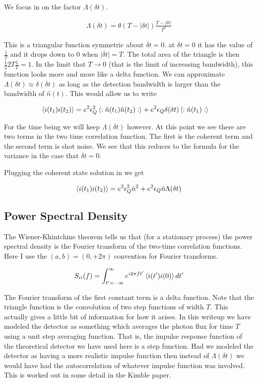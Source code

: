 \documentclass[12pt]{article}
\begin{document}
We focus in on the factor $\Lambda(\delta t)$. 

\begin{align}
\Lambda(\delta t) = \theta(T - |\delta t|)\frac{T-|\delta t|}{T^2}
\end{align}

This is a triangular function symmetric about $\delta t=0$. at $\delta t=0$ it has the value of $\frac{1}{T}$ and it drops down to 0 when $|\delta t| = T$. The total area of the triangle is then $\frac{1}{2} 2T \frac{1}{T} = 1$. In the limit that $T \rightarrow 0$ (that is the limit of increasing bandwidth), this function looks more and more like a delta function. We can approximate $\Lambda(\delta t) \approx \delta(\delta t)$ as long as the detection bandwidth is larger than the bandwidth of $\hat{n}(t)$. This would allow us to write

\begin{align}
\Braket{i(t_1)i(t_2)} &=e^2 \epsilon_Q^2 \Braket{:\hat{n}(t_1)\hat{n}(t_2):} + e^2 \epsilon_Q \delta(\delta t) \braket{:\hat{n}(t_1):}
\end{align}

For the time being we will keep $\Lambda(\delta t)$ however. At this point we see there are two terms in the two time correlation function. The first is the coherent term and the second term is shot noise. We see that this reduces to the formula for the variance in the case that $\delta t=0$.

Plugging the coherent state solution in we get

\begin{align}
\braket{i(t_1)i(t_2)} = e^2 \epsilon_Q^2 \bar{n}^2 + e^2 \epsilon_Q \bar{n} \Lambda(\delta t)
\end{align}

\subsection{Power Spectral Density}

The Wiener-Khintchine theorem tells us that (for a stationary process) the power spectral density is the Fourier transform of the two-time correlation functions. Here I use the $(a,b) = (0,+2\pi)$ convention for Fourier transforms.

\begin{align}
S_{ii}(f) = \int_{t'=-\infty}^{\infty} e^{i2\pi f t'} \Braket{i(t')i(0)} dt'
\end{align}

The Fourier transform of the first constant term is a delta function. 
Note that the triangle function is the convolution of two step functions of width $T$. This actually gives a little bit of information for how it arises. In this writeup we have modeled the detector as something which averages the photon flux for time $T$ using a unit step averaging function. That is, the impulse response function of the theoretical detector we have used here is a step function. Had we modeled the detector as having a more realistic impulse function then instead of $\Lambda(\delta t)$ we would have had the autocorrelation of whatever impulse function was involved. This is worked out in some detail in the Kimble paper.
\end{document}
